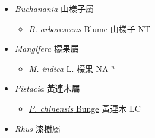 
  \begin{itemize}
 \item[] \textit{Buchanania} 山檨子屬
                    
  \begin{itemize}
        \item[] \href{http://www.theplantlist.org/tpl1.1/search?q=Buchanania+arborescens}{\textit{B. arborescens} Blume}   山檨子 NT
  \end{itemize}
 \item[] \textit{Mangifera} 檬果屬
                    
  \begin{itemize}
        \item[] \href{http://www.theplantlist.org/tpl1.1/search?q=Mangifera+indica}{\textit{M. indica} L.}   檬果 NA $^n$
  \end{itemize}
 \item[] \textit{Pistacia} 黃連木屬
                    
  \begin{itemize}
        \item[] \href{http://www.theplantlist.org/tpl1.1/search?q=Pistacia+chinensis}{\textit{P. chinensis} Bunge}   黃連木 LC
  \end{itemize}
 \item[] \textit{Rhus} 漆樹屬
                    

\end{itemize}
